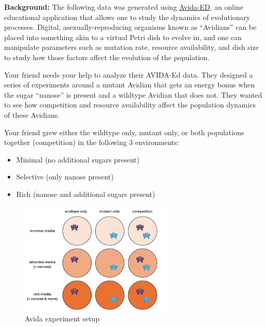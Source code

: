 \documentclass[
  letterpaper,
  DIV=11,
  numbers=noendperiod]{scrreprt}
\begin{document}
\textbf{Background:} The following data was generated using
\href{https://avida-ed.msu.edu/avida-ed-application/}{Avida-ED}, an
online educational application that allows one to study the dynamics of
evolutionary processes. Digital, asexually-reproducing organisms known
as ``Avidians'' can be placed into something akin to a virtual Petri
dish to evolve in, and one can manipulate parameters such as mutation
rate, resource availability, and dish size to study how those factors
affect the evolution of the population.

Your friend needs your help to analyze their AVIDA-Ed data. They
designed a series of experiments around a mutant Avidian that gets an
energy bonus when the sugar ``nanose'' is present and a wildtype Avidian
that does not. They wanted to see how competition and resource
availability affect the population dynamics of these Avidians.

Your friend grew either the wildtype only, mutant only, or both
populations together (competition) in the following 3 environments:

\begin{itemize}
\item
  Minimal (no additional sugars present)
\item
  Selective (only nanose present)
\item
  Rich (nanose and additional sugars present)
\end{itemize}

\begin{figure}[H]

{\centering \includegraphics[width=0.65\textwidth,height=\textheight]{scripts/04_projects/project-day-2-files/figs/avida-expt.png}

}

\caption{Avida experiment setup}

\end{figure}%
\end{document}
